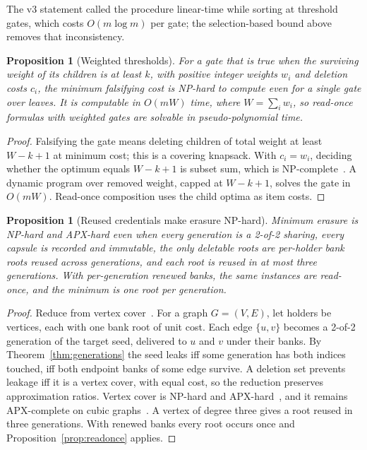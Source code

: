 \documentclass[pdflatex,sn-mathphys-num]{sn-jnl}
\theoremstyle{plain}
\newtheorem{proposition}[theorem]{Proposition}
\theoremstyle{definition}
\begin{document}
The v3 statement called the procedure linear-time while sorting at threshold gates, which costs $O(m\log m)$ per gate; the selection-based bound above removes that inconsistency.

\begin{proposition}[Weighted thresholds]\label{prop:weighted}
For a gate that is true when the surviving weight of its children is at least $k$, with positive integer weights $w_i$ and deletion costs $c_i$, the minimum falsifying cost is NP-hard to compute even for a single gate over leaves. It is computable in $O(mW)$ time, where $W=\sum_iw_i$, so read-once formulas with weighted gates are solvable in pseudo-polynomial time.
\end{proposition}
\begin{proof}
Falsifying the gate means deleting children of total weight at least $W-k+1$ at minimum cost; this is a covering knapsack. With $c_i=w_i$, deciding whether the optimum equals $W-k+1$ is subset sum, which is NP-complete~\cite{karp1972}. A dynamic program over removed weight, capped at $W-k+1$, solves the gate in $O(mW)$. Read-once composition uses the child optima as item costs.
\end{proof}

\begin{proposition}[Reused credentials make erasure NP-hard]\label{prop:hard}
Minimum erasure is NP-hard and APX-hard even when every generation is a 2-of-2 sharing, every capsule is recorded and immutable, the only deletable roots are per-holder bank roots reused across generations, and each root is reused in at most three generations. With per-generation renewed banks, the same instances are read-once, and the minimum is one root per generation.
\end{proposition}
\begin{proof}
Reduce from vertex cover~\cite{karp1972}. For a graph $G=(V,E)$, let holders be vertices, each with one bank root of unit cost. Each edge $\{u,v\}$ becomes a 2-of-2 generation of the target seed, delivered to $u$ and $v$ under their banks. By Theorem~\ref{thm:generations} the seed leaks iff some generation has both indices touched, iff both endpoint banks of some edge survive. A deletion set prevents leakage iff it is a vertex cover, with equal cost, so the reduction preserves approximation ratios. Vertex cover is NP-hard and APX-hard~\cite{karp1972,dinur2005}, and it remains APX-complete on cubic graphs~\cite{alimonti2000}. A vertex of degree three gives a root reused in three generations. With renewed banks every root occurs once and Proposition~\ref{prop:readonce} applies.
\end{proof}
\end{document}
